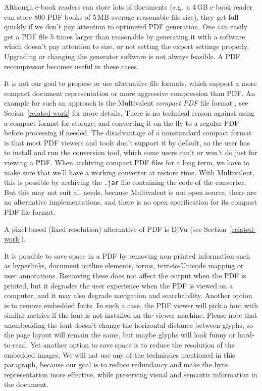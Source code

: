 \documentclass{ltugproc}
\begin{document}
Although e-book readers can store lots of documents (e.g.\ a 4\,GB e-book
reader can store 800 PDF books of 5\,MB average reasonable file size), they
get full quickly if we don't pay attention to optimized PDF generation. One
can easily get a PDF file 5 times larger than reasonable by generating it
with a software which doesn't pay attention to size,
or not setting the export settings
properly. Upgrading or changing the generator software is not always
feasible. A PDF recompressor becomes useful in these cases.

It is not our goal to propose or use alternative file formats, which support
a more compact document representation or more aggressive compression than
PDF. An example for such an approach is the Multivalent \emph{compact PDF}
file format \cite{multivalent-compact}, see Secion~\ref{related-work} for
more details. There is no technical reason against using a compact format
for storage, and converting it on the fly to a regular PDF before processing
if needed. The disadvantage of a nonstandard compact format is that most PDF
viewers and tools don't support it by default, so the user has to install
and run the conversion tool, which some users can't or won't do just for
viewing a PDF. When archiving compact PDF files for a long term, we have to
make sure that we'll have a working converter at restore time. With
Multivalent, this is possible by archiving the \texttt{.jar} file containing
the code of the converter. But this may not suit all needs, because
Multivalent is not open source, there are no alternative implementations,
and there is no open specification for its compact PDF file format.

A pixel-based (fixed resolution) alternative of PDF is DjVu (see
Section~\ref{related-work}).

It is possible to save space in a PDF by removing non-printed information
such as hyperlinks, document outline elements, forms, text-to-Unicode
mapping or user annotations. Removing these does not affect the output when
the PDF is printed, but it degrades the user experience when the PDF is
viewed on a computer, and it may also degrade navigation and searchability.
Another option is to remove embedded fonts. In such a case, the PDF viewer
will pick a font with similar metrics if the font is not installed on the
viewer machine. Please note that unembedding the font doesn't change the
horizontal distance between glyphs, so the page layout will remain the
same, but maybe glyphs will look funny or hard-to-read. Yet another option
to save space is to reduce the resolution of the embedded images. We will
not use any of the techniques mentioned in this paragraph, because our goal
is to reduce redundancy and make the byte representation more effective,
while preserving visual and semantic information in the document.
\end{document}
